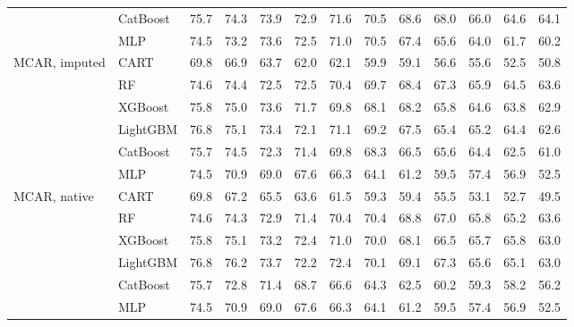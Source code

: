 \begin{table}[p]
\begin{tabular}{@{}llrrrrrrrrrrr@{}}
 & CatBoost & 75.7 & 74.3 & 73.9 & 72.9 & 71.6 & 70.5 & 68.6 & 68.0 & 66.0 & 64.6 & 64.1 \\
 & MLP & 74.5 & 73.2 & 73.6 & 72.5 & 71.0 & 70.5 & 67.4 & 65.6 & 64.0 & 61.7 & 60.2 \\
\midrule
MCAR, imputed & CART & 69.8 & 66.9 & 63.7 & 62.0 & 62.1 & 59.9 & 59.1 & 56.6 & 55.6 & 52.5 & 50.8 \\
 & RF & 74.6 & 74.4 & 72.5 & 72.5 & 70.4 & 69.7 & 68.4 & 67.3 & 65.9 & 64.5 & 63.6 \\
 & XGBoost & 75.8 & 75.0 & 73.6 & 71.7 & 69.8 & 68.1 & 68.2 & 65.8 & 64.6 & 63.8 & 62.9 \\
 & LightGBM & 76.8 & 75.1 & 73.4 & 72.1 & 71.1 & 69.2 & 67.5 & 65.4 & 65.2 & 64.4 & 62.6 \\
 & CatBoost & 75.7 & 74.5 & 72.3 & 71.4 & 69.8 & 68.3 & 66.5 & 65.6 & 64.4 & 62.5 & 61.0 \\
 & MLP & 74.5 & 70.9 & 69.0 & 67.6 & 66.3 & 64.1 & 61.2 & 59.5 & 57.4 & 56.9 & 52.5 \\
\midrule
MCAR, native & CART & 69.8 & 67.2 & 65.5 & 63.6 & 61.5 & 59.3 & 59.4 & 55.5 & 53.1 & 52.7 & 49.5 \\
 & RF & 74.6 & 74.3 & 72.9 & 71.4 & 70.4 & 70.4 & 68.8 & 67.0 & 65.8 & 65.2 & 63.6 \\
 & XGBoost & 75.8 & 75.1 & 73.2 & 72.4 & 71.0 & 70.0 & 68.1 & 66.5 & 65.7 & 65.8 & 63.0 \\
 & LightGBM & 76.8 & 76.2 & 73.7 & 72.2 & 72.4 & 70.1 & 69.1 & 67.3 & 65.6 & 65.1 & 63.0 \\
 & CatBoost & 75.7 & 72.8 & 71.4 & 68.7 & 66.6 & 64.3 & 62.5 & 60.2 & 59.3 & 58.2 & 56.2 \\
 & MLP & 74.5 & 70.9 & 69.0 & 67.6 & 66.3 & 64.1 & 61.2 & 59.5 & 57.4 & 56.9 & 52.5 \\
\bottomrule
\end{tabular}
\end{table}

